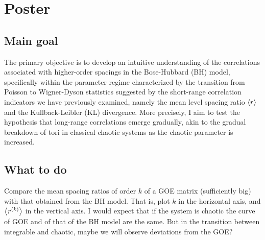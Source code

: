 
\section{Poster}
\subsection{Main goal}
The primary objective is to develop an intuitive understanding of the 
correlations associated with higher-order spacings in the Bose-Hubbard (BH) 
model, specifically within the parameter regime characterized by the 
transition from Poisson to Wigner-Dyson statistics suggested by the short-range 
correlation indicators we have previously examined, namely the mean level 
spacing ratio $\ev{r}$ and the Kullback-Leibler (KL) divergence. 
More precisely, I aim to test the hypothesis that long-range correlations emerge gradually, akin to the gradual breakdown of tori in classical chaotic systems as the chaotic parameter is increased.

\subsection{What to do}
Compare the mean spacing ratios of order $k$ of a GOE matrix (sufficiently big)
with that obtained from the BH model. That is, plot $k$ in the horizontal
axis, and $\ev{r^{(k)}}$ in the vertical axis. I would expect that if the 
system is chaotic the curve of GOE and of that of the BH model are the same.
But in the transition between integrable and chaotic, maybe we will observe 
deviations from the GOE? 

%
